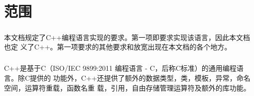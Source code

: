 \chapter{范围}
\paragraph{}
本文档规定了C++编程语言实现的要求。第一项即要求实现该语言，因此本文档也定
义了C++。第一项要求的其他要求和放宽出现在本文档的各个地方。
\paragraph{}
C++是基于C（ISO/IEC 9899:2011 编程语言 - C，后称C标准）的通用编程语言。除C提供的
功能外，C++还提供了额外的数据类型，类，模板，异常，命名空间，运算符重载，函数名重
载，引用，自由存储管理运算符及额外的库功能。

